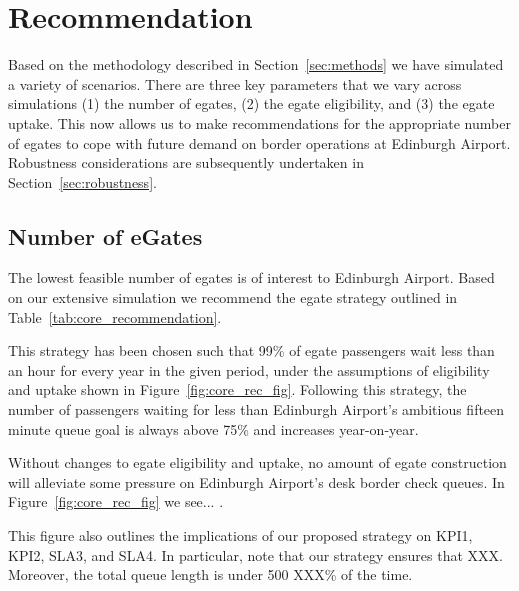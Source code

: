 \documentclass[10pt]{article}
\begin{document}
\section{Recommendation}

Based on the methodology described in Section~\ref{sec:methods} we have simulated a variety of scenarios. There are three key parameters that we vary across simulations (1) the number of \glspl{egate}, (2) the \gls{egate} eligibility, and (3) the \gls{egate} uptake. This now allows us to make recommendations for the appropriate number of \glspl{egate} to cope with future demand on border operations at Edinburgh Airport. Robustness considerations are subsequently undertaken in Section~\ref{sec:robustness}. 

\subsection{Number of eGates}

The lowest feasible number of \glspl{egate} is of interest to Edinburgh Airport. Based on our extensive simulation we recommend the \gls{egate} strategy outlined in Table~\ref{tab:core_recommendation}. 




This strategy has been chosen such that 99\% of \gls{egate} passengers wait less than an hour for every year in the given period, under the assumptions of eligibility and uptake shown in Figure~\ref{fig:core_rec_fig}. Following this strategy, the number of passengers waiting for less than Edinburgh Airport's ambitious fifteen minute queue goal is always above 75\% and increases year-on-year. 

Without changes to \gls{egate} eligibility and uptake, no amount of \gls{egate} construction will alleviate some pressure on Edinburgh Airport's desk border check queues. In Figure~\ref{fig:core_rec_fig} we see... .

This figure also outlines the implications of our proposed strategy on KPI1, KPI2, SLA3, and SLA4. In particular, note that our strategy ensures that XXX. Moreover, the total queue length is under 500 XXX\% of the time.
\end{document}
